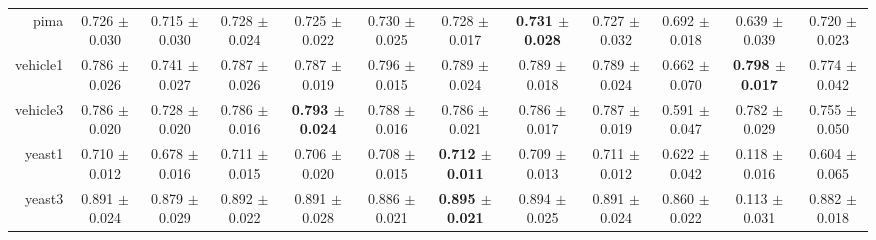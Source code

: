 \begin{table}[!ht]
{\begin{tabular}{r c c c c c c c c c c c}
pima & 0.726 $\pm$ 0.030 & 0.715 $\pm$ 0.030 & 0.728 $\pm$ 0.024 & 0.725 $\pm$ 0.022 & 0.730 $\pm$ 0.025 & 0.728 $\pm$ 0.017 & \textbf{0.731 $\pm$ 0.028} & 0.727 $\pm$ 0.032 & 0.692 $\pm$ 0.018 & 0.639 $\pm$ 0.039 & 0.720 $\pm$ 0.023 \\
vehicle1 & 0.786 $\pm$ 0.026 & 0.741 $\pm$ 0.027 & 0.787 $\pm$ 0.026 & 0.787 $\pm$ 0.019 & 0.796 $\pm$ 0.015 & 0.789 $\pm$ 0.024 & 0.789 $\pm$ 0.018 & 0.789 $\pm$ 0.024 & 0.662 $\pm$ 0.070 & \textbf{0.798 $\pm$ 0.017} & 0.774 $\pm$ 0.042 \\
vehicle3 & 0.786 $\pm$ 0.020 & 0.728 $\pm$ 0.020 & 0.786 $\pm$ 0.016 & \textbf{0.793 $\pm$ 0.024} & 0.788 $\pm$ 0.016 & 0.786 $\pm$ 0.021 & 0.786 $\pm$ 0.017 & 0.787 $\pm$ 0.019 & 0.591 $\pm$ 0.047 & 0.782 $\pm$ 0.029 & 0.755 $\pm$ 0.050 \\
yeast1 & 0.710 $\pm$ 0.012 & 0.678 $\pm$ 0.016 & 0.711 $\pm$ 0.015 & 0.706 $\pm$ 0.020 & 0.708 $\pm$ 0.015 & \textbf{0.712 $\pm$ 0.011} & 0.709 $\pm$ 0.013 & 0.711 $\pm$ 0.012 & 0.622 $\pm$ 0.042 & 0.118 $\pm$ 0.016 & 0.604 $\pm$ 0.065 \\
yeast3 & 0.891 $\pm$ 0.024 & 0.879 $\pm$ 0.029 & 0.892 $\pm$ 0.022 & 0.891 $\pm$ 0.028 & 0.886 $\pm$ 0.021 & \textbf{0.895 $\pm$ 0.021} & 0.894 $\pm$ 0.025 & 0.891 $\pm$ 0.024 & 0.860 $\pm$ 0.022 & 0.113 $\pm$ 0.031 & 0.882 $\pm$ 0.018 \\
\end{tabular}}
\end{table}
